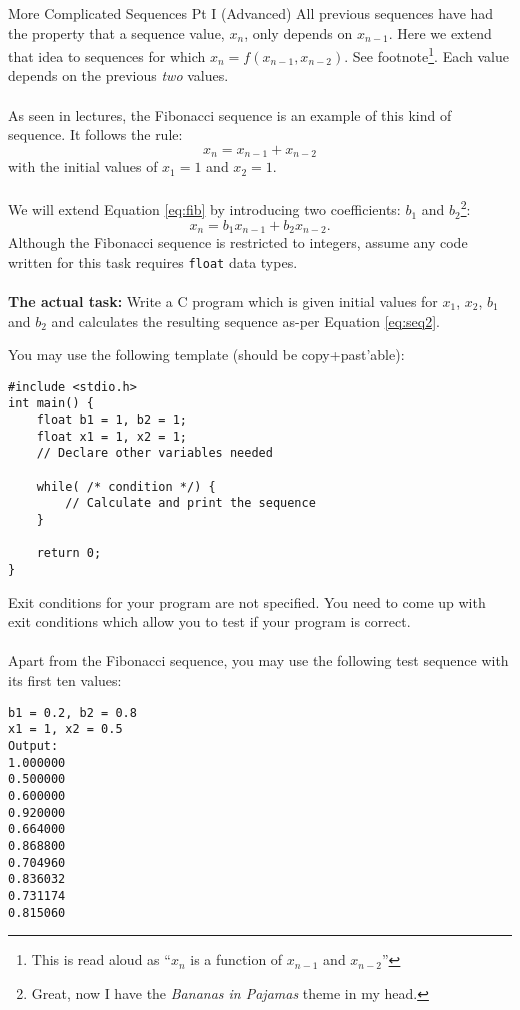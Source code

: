 \documentclass{lab}
\begin{document}
\begin{task}{More Complicated Sequences Pt I (Advanced)}{}
All previous sequences have had the property that a sequence value, $x_n$, only depends on $x_{n-1}$. Here we extend that idea to sequences for which $x_n = f(x_{n-1}, x_{n-2})$. See footnote\footnote{This is read aloud as ``$x_n$ is a function of $x_{n-1}$ and $x_{n-2}$''}. Each value depends on the previous \textit{two} values.
\\ \\
As seen in lectures, the Fibonacci sequence is an example of this kind of sequence. It follows the rule:
\begin{equation}\label{eq:fib}
x_n = x_{n-1} + x_{n-2}
\end{equation}
with the initial values of $x_1 = 1$ and $x_2 = 1$.
\\ \\
We will extend Equation \eqref{eq:fib} by introducing two coefficients: $b_1$ and $b_2$\footnote{Great, now I have the \textit{Bananas in Pajamas} theme in my head.}:
\begin{equation}\label{eq:seq2}
x_n = b_1x_{n-1} + b_2x_{n-2}.
\end{equation}
Although the Fibonacci sequence is restricted to integers, assume any code written for this task requires \texttt{float} data types.
\\ \\
\textbf{The actual task:} Write a C program which is given initial values for $x_1$, $x_2$, $b_1$ and $b_2$ and calculates the resulting sequence as-per Equation \eqref{eq:seq2}.

You may use the following template (should be copy+past'able):
\begin{lstlisting}[style=pseudo]
#include <stdio.h>
int main() {
	float b1 = 1, b2 = 1;
	float x1 = 1, x2 = 1;
	// Declare other variables needed
		
	while( /* condition */) {
		// Calculate and print the sequence
	}	
	
	return 0;
}
\end{lstlisting}
Exit conditions for your program are not specified. You need to come up with exit conditions which allow you to test if your program is correct.
\\ \\
Apart from the Fibonacci sequence, you may use the following test sequence with its first ten values:
\begin{lstlisting}[style=pseudo]
b1 = 0.2, b2 = 0.8
x1 = 1, x2 = 0.5
Output:
1.000000
0.500000
0.600000
0.920000
0.664000
0.868800
0.704960
0.836032
0.731174
0.815060
\end{lstlisting}
\end{task}
\end{document}
